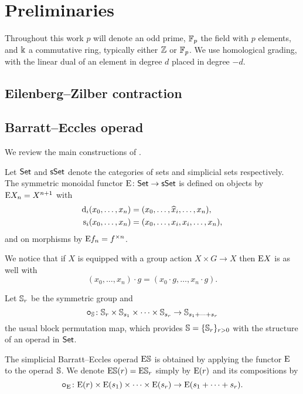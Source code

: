 
\section{Preliminaries}

Throughout this work $p$ will denote an odd prime, ${\mathbb{F}_p}$ the field with $p$ elements, and $\Bbbk$ a commutative ring, typically either $\mathbb{Z}$ or ${\mathbb{F}_p}$.
We use homological grading, with the linear dual of an element in degree $d$ placed in degree $-d$.

\subsection{Eilenberg--Zilber contraction}

\TBW

\subsection{Barratt--Eccles operad}

We review the main constructions of \cite{berger2004combinatorial}.

\sssec

Let $\mathsf{Set}$ and $\mathsf{sSet}$ denote the categories of sets and simplicial sets respectively.
The symmetric monoidal functor $\mathrm{E} \colon \mathsf{Set} \to \mathsf{sSet}$ is defined on objects by $\mathrm{E} X_n = X^{n+1}$ with
\[
\begin{split}
	\operatorname{d}_i(x_0,\dots,x_n) &= (x_0,\dots,\widehat{x}_i,\dots,x_n), \\
	\operatorname{s}_i(x_0,\dots,x_n) &= (x_0, \dots, x_i, x_i, \dots, x_n),
\end{split}
\]
and on morphisms by $\mathrm{E} f_n = f^{\times n}$.

We notice that if $X$ is equipped with a group action $X \times G \to X$ then $\mathrm{E} X$ is as well with
\[
(x_0,\dots,x_n) \cdot g = (x_0 \cdot g, \dots, x_n \cdot g).
\]

\sssec

Let $\mathbb{S}_r$ be the symmetric group and
\[
\bm{\circ}_{\mathbb{S}} \colon \mathbb{S}_r \times \mathbb{S}_{s_1} \times \cdots \times \mathbb{S}_{s_r} \to \mathbb{S}_{s_1+\dots+s_r}
\]
the usual block permutation map, which provides $\mathbb{S} = \{\mathbb{S}_r\}_{r>0}$ with the structure of an operad in $\mathsf{Set}$.

\sssec

The simplicial Barratt--Eccles operad $\mathrm{E}\mathbb{S}$ is obtained by applying the functor $\mathrm{E}$ to the operad $\mathbb{S}$.
We denote $\mathrm{E}\mathbb{S}(r) = \mathrm{E}\mathbb{S}_r$ simply by $\mathrm{E}(r)$ and its compositions by
\[
\bm{\circ}_{\mathrm{E}} \colon \mathrm{E}(r) \times \mathrm{E}(s_1) \times\dots\times \mathrm{E}(s_r) \to \mathrm{E}(s_1+\dots+s_r).
\]

